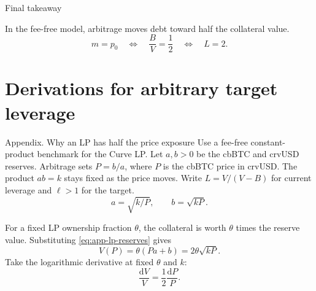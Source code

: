 \documentclass[aspectratio=169,11pt]{beamer}
\begin{document}
\begin{frame}{Final takeaway}
  \centering
  \setlength{\fboxsep}{7pt}
  {\Large{}\par}

  \bigskip
  In the fee-free model, arbitrage moves debt toward half the collateral value.
  \begin{equation}\label{eq:final-takeaway}
    \boxed{m=p_0\quad\Longleftrightarrow\quad
    \frac{B}{V}=\frac12\quad\Longleftrightarrow\quad L=2.}
  \end{equation}
\end{frame}

\appendix
\section{Derivations for arbitrary target leverage}
\setcounter{equation}{0}
\renewcommand{\theequation}{A.\arabic{equation}}
\renewcommand{\theHequation}{appendix.\arabic{equation}}

\begin{frame}{Appendix. Why an LP has half the price exposure}
  Use a fee-free constant-product benchmark for the Curve LP.
  Let $a,b>0$ be the cbBTC and crvUSD reserves. Arbitrage sets
  $P=b/a$, where $P$ is the cbBTC price in crvUSD. The product $ab=k$
  stays fixed as the price moves. Write $L=V/(V-B)$ for current leverage
  and $\ell>1$ for the target.
  \begin{equation}\label{eq:app-lp-reserves}
    a=\sqrt{k/P},\qquad b=\sqrt{kP}.
  \end{equation}

  For a fixed LP ownership fraction $\theta$, the collateral is worth
  $\theta$ times the reserve value. Substituting \eqref{eq:app-lp-reserves}
  gives
  \begin{equation}\label{eq:app-lp-value}
    V(P)=\theta(Pa+b)=2\theta\sqrt{kP}.
  \end{equation}
  Take the logarithmic derivative at fixed $\theta$ and $k$:
  \begin{equation}\label{eq:app-lp-elasticity}
    \frac{\mathrm dV}{V}=\frac12\frac{\mathrm dP}{P}.
  \end{equation}
\end{frame}
\end{document}
